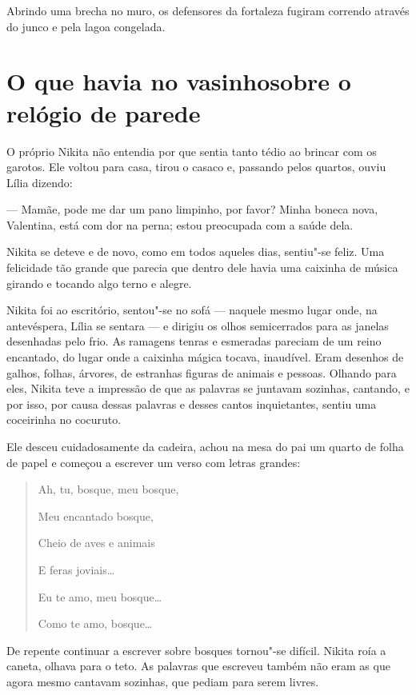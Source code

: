 Abrindo uma brecha no muro, os defensores da fortaleza fugiram
correndo através do junco e pela lagoa congelada.

\chapter{O que havia no vasinho\break sobre o relógio de parede}

O próprio Nikita não entendia por que sentia tanto tédio ao brincar com
os garotos. Ele voltou para casa, tirou o casaco e, passando pelos
quartos, ouviu Lília dizendo:

--- Mamãe, pode me dar um pano limpinho, por favor? Minha boneca nova,
Valentina, está com dor na perna; estou preocupada com a saúde dela.

Nikita se deteve e de novo, como em todos aqueles dias, sentiu"-se
feliz. Uma felicidade tão grande que parecia que dentro dele havia uma
caixinha de música girando e tocando algo terno e alegre.

Nikita foi ao escritório, sentou"-se no sofá --- naquele mesmo lugar onde,
na antevéspera, Lília se sentara --- e dirigiu os olhos semicerrados
para as janelas desenhadas pelo frio. As ramagens tenras e
esmeradas pareciam de um reino encantado, do lugar onde a caixinha
mágica tocava, inaudível. Eram desenhos de galhos, folhas, árvores, de
estranhas figuras de animais e pessoas. Olhando para eles, Nikita teve a
impressão de que as palavras se juntavam sozinhas, cantando, e por isso,
por causa dessas palavras e desses cantos inquietantes, sentiu uma
coceirinha no cocuruto.

Ele desceu cuidadosamente da cadeira, achou na mesa do pai um quarto de
folha de papel e começou a escrever um verso com letras grandes:

\begin{quotation}
Ah, tu, bosque, meu bosque,

Meu encantado bosque,

Cheio de aves e animais

E feras joviais\ldots{}

Eu te amo, meu bosque\ldots{}

Como te amo, bosque\ldots{}
\end{quotation}

De repente continuar a escrever sobre bosques tornou"-se difícil. Nikita
roía a caneta, olhava para o teto. As palavras que escreveu também não
eram as que agora mesmo cantavam sozinhas, que pediam para serem livres.

